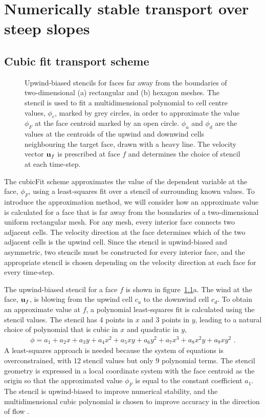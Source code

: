\chapter{Numerically stable transport over steep slopes}
\label{ch:cubicFit}

\section{Cubic fit transport scheme}

\begin{figure}
	\centering
	
	\caption{Upwind-biased stencils for faces far away from the boundaries of two-dimensional (a) rectangular and (b) hexagon meshes.  The stencil is used to fit a multidimensional polynomial to cell centre values, $\phi_c$, marked by grey circles, in order to approximate the value $\phi_F$ at the face centroid marked by an open circle.  $\phi_u$ and $\phi_d$ are the values at the centroids of the upwind and downwind cells neighbouring the target face, drawn with a heavy line.  The velocity vector $\mathbf{u}_f$ is prescribed at face $f$ and determines the choice of stencil at each time-step.}
	\label{fig:cubicFit:interiorStencils}
\end{figure}

The cubicFit scheme approximates the value of the dependent variable at the face, $\phi_F$, using a least-squares fit over a stencil of surrounding known values.
To introduce the approximation method, we will consider how an approximate value is calculated for a face that is far away from the boundaries of a two-dimensional uniform rectangular mesh.
For any mesh, every interior face connects two adjacent cells.  The velocity direction at the face determines which of the two adjacent cells is the upwind cell.  Since the stencil is upwind-biased and asymmetric, two stencils must be constructed for every interior face, and the appropriate stencil is chosen depending on the velocity direction at each face for every time-step.

The upwind-biased stencil for a face $f$ is shown in figure~\ref{fig:cubicFit:interiorStencils}a.  The wind at the face, $\mathbf{u}_f$, is blowing from the upwind cell $c_u$ to the downwind cell $c_d$.
To obtain an approximate value at $f$, a polynomial least-squares fit is calculated using the stencil values.
The stencil has \num{4} points in $x$ and \num{3} points in $y$, leading to a natural choice of polynomial that is cubic in $x$ and quadratic in $y$,
\begin{align}
	\phi = a_1 + a_2 x + a_3 y + a_4 x^2 + a_5 xy + a_6 y^2 + a_7 x^3 + a_8 x^2 y + a_9 x y^2 \label{eqn:cubicFit:fullPoly} \text{ .}
\end{align}
A least-squares approach is needed because the system of equations is overconstrained, with \num{12} stencil values but only \num{9} polynomial terms.  The stencil geometry is expressed in a local coordinate system with the face centroid as the origin so that the approximated value $\phi_F$ is equal to the constant coefficient $a_1$.
The stencil is upwind-biased to improve numerical stability, and the multidimensional cubic polynomial is chosen to improve accuracy in the direction of flow \citep{leonard1993}.

